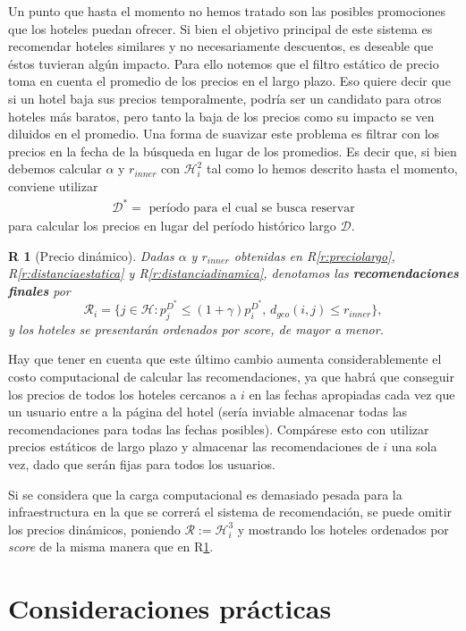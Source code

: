 \documentclass[12pt]{report}
\newcommand{\HH}{\mathcal{H}}
\newcommand{\RR}{\mathcal{R}}
\newtheorem{regla}{R}%
\begin{document}
Un punto que hasta el momento no hemos tratado son las posibles promociones que los hoteles puedan ofrecer. Si bien el objetivo principal de este sistema es recomendar hoteles similares y no necesariamente descuentos, es deseable que éstos tuvieran algún impacto. Para ello notemos que el filtro estático de precio toma en cuenta el promedio de los precios en el largo plazo. Eso quiere decir que si un hotel baja sus precios temporalmente, podría ser un candidato para otros hoteles más baratos, pero tanto la baja de los precios como su impacto se ven diluidos en el promedio. Una forma de suavizar este problema es filtrar con los precios en la fecha de la búsqueda en lugar de los promedios. Es decir que, si bien debemos calcular $\alpha$ y $r_{inner}$ con $\HH_i^2$ tal como lo hemos descrito hasta el momento, conviene utilizar
\begin{align}
	\mathcal{D^*} = \text{ período para el cual se busca reservar}
\end{align}
para calcular los precios en lugar del período histórico largo $\mathcal{D}$.
\begin{regla}[Precio dinámico] \label{r:preciodinamico}
Dadas $\alpha$ y $r_{inner}$ obtenidas en R\ref{r:preciolargo}, R\ref{r:distanciaestatica} y R\ref{r:distanciadinamica}, denotamos las \textbf{recomendaciones finales} por
\[
\RR_i = \{j \in \HH : p^{D^*}_j \leq (1 + \gamma)p^{D^*}_i \text{,  } d_{geo}(i,j) \leq r_{inner}\},
\]
y los hoteles se presentarán ordenados por \emph{score}, de mayor a menor.
\end{regla}
Hay que tener en cuenta que este último cambio aumenta considerablemente el costo computacional de calcular las recomendaciones, ya que habrá que conseguir los precios de todos los hoteles cercanos a $i$ en las fechas apropiadas cada vez que un usuario entre a la página del hotel (sería inviable almacenar todas las recomendaciones para todas las fechas posibles). Compárese esto con utilizar precios estáticos de largo plazo y almacenar las recomendaciones de $i$ una sola vez, dado que serán fijas para todos los usuarios.

Si se considera que la carga computacional es demasiado pesada para la infraestructura en la que se correrá el sistema de recomendación, se puede omitir los precios dinámicos, poniendo $\RR := \HH_i^3$ y mostrando los hoteles ordenados por \emph{score} de la misma manera que en R\ref{r:preciodinamico}.

\section{Consideraciones prácticas}
\end{document}
